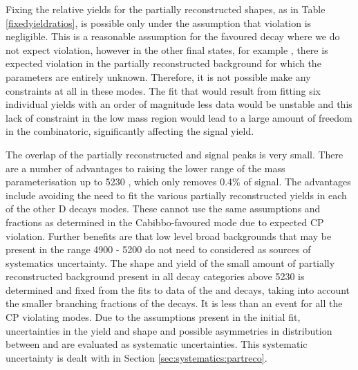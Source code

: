 Fixing the relative yields for the partially reconstructed shapes, as in Table \ref{fixedyieldratios}, is possible only under the assumption that \CP violation is negligible. This is a reasonable assumption for the favoured \kpi decay where we do not expect \CP violation, however in the other \D final states, for example \pik, there is expected \CP violation in the partially reconstructed background for which the parameters are entirely unknown. Therefore, it is not possible make any constraints at all in these modes. The fit that would result from fitting six individual yields with an order of magnitude less data would be unstable and this lack of constraint in the low mass region would lead to a large amount of freedom in the combinatoric, significantly affecting the signal yield. 

The overlap of the partially reconstructed and signal peaks is very small. There are a number of advantages to raising the lower range of the mass parameterisation up to 5230 \mev, which only removes 0.4\% of signal. The advantages include avoiding the need to fit the various partially reconstructed yields in each of the other D decays modes. These cannot use the same assumptions and fractions as determined in the Cabibbo-favoured mode due to expected CP violation. Further benefits are that low level broad backgrounds that may be present in the range 4900 - 5200 \mev do not need to considered as sources of systematics uncertainty. The shape and yield of the small amount of partially reconstructed background present in all \D decay categories above 5230 \mev is determined and fixed from the fits to data of the \kpi and \kpipipi decays, taking into account the smaller branching fractions of the \D decays. It is less than an event for all the CP violating modes. Due to the assumptions present in the initial fit, uncertainties in the yield and shape and possible asymmetries in distribution between \Bp and \Bm are evaluated as systematic uncertainties. This systematic uncertainty is dealt with in Section \ref{sec:systematics:partreco}.


\clearpage
